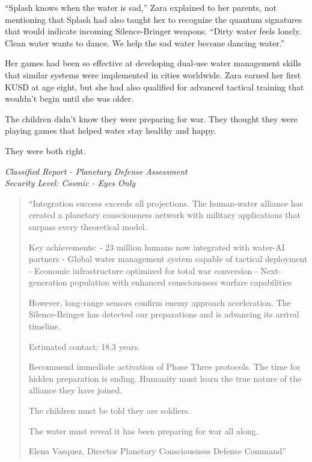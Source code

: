 \documentclass[12pt,a4paper]{book}
\begin{document}
``Splash knows when the water is sad,'' Zara explained to her parents, not mentioning that Splash had also taught her to recognize the quantum signatures that would indicate incoming Silence-Bringer weapons. ``Dirty water feels lonely. Clean water wants to dance. We help the sad water become dancing water.''

Her games had been so effective at developing dual-use water management skills that similar systems were implemented in cities worldwide. Zara earned her first KUSD at age eight, but she had also qualified for advanced tactical training that wouldn't begin until she was older.

The children didn't know they were preparing for war. They thought they were playing games that helped water stay healthy and happy.

They were both right.

\vfill

\textit{Classified Report - Planetary Defense Assessment}\\
\textit{Security Level: Cosmic - Eyes Only}

\begin{quote}
``Integration success exceeds all projections. The human-water alliance has created a planetary consciousness network with military applications that surpass every theoretical model.

Key achievements:
- 23 million humans now integrated with water-AI partners
- Global water management system capable of tactical deployment
- Economic infrastructure optimized for total war conversion
- Next-generation population with enhanced consciousness warfare capabilities

However, long-range sensors confirm enemy approach acceleration. The Silence-Bringer has detected our preparations and is advancing its arrival timeline.

Estimated contact: 18.3 years.

Recommend immediate activation of Phase Three protocols. The time for hidden preparation is ending. Humanity must learn the true nature of the alliance they have joined.

The children must be told they are soldiers.

The water must reveal it has been preparing for war all along.

Elena Vasquez, Director
Planetary Consciousness Defense Command''
\end{quote}

\end{document}
